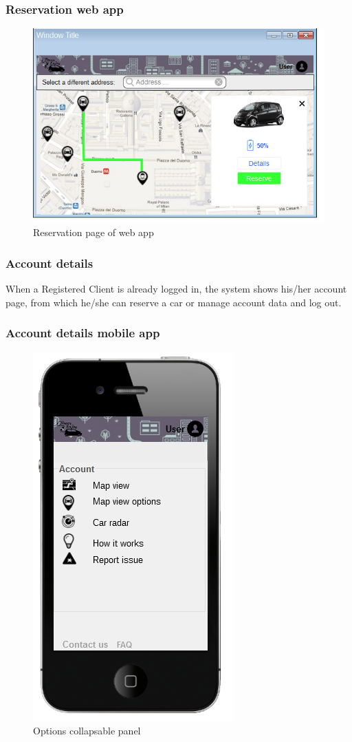 \subsubsection{Reservation web app}
\begin{figure}[H]
\centering
\includegraphics[]{../images/mookup/Reservation_web}
\caption{Reservation page of web app}
\end{figure}

\clearpage
\subsubsection{Account details}
When a Registered Client is already logged in, the system shows his/her account page, from which he/she can reserve a car or manage account data and log out.
\subsubsection{Account details mobile app}
\begin{figure}[H]
\centering
\includegraphics[]{../images/mookup/Account_mobile_sx}
\caption{Options collapsable panel}
\end{figure}

